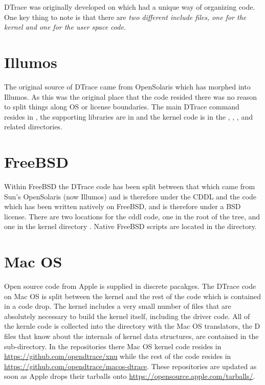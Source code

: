 DTrace was originally developed on  which had a
unique way of organizing code.  One key thing to note is that there
are \em{two different}  include files, one for the
kernel and one for the user space code.

\section{Illumos}
\label{sec:illumos-code}

The original source of DTrace came from OpenSolaris which has morphed
into Illumos.  As this was the original place that the code resided
there was no reason to split things along OS or license boundaries.
The main DTrace command resides in , the supporting
libraries are in  and the kernel code is in
the , , ,
and related directories.

\section{FreeBSD}
\label{sec:freebsd-code}

Within FreeBSD the DTrace code has been split between that which came
from Sun's OpenSolaris (now Illumos) and is therefore under the CDDL
and the code which has been written natively on FreeBSD, and is
therefore under a BSD license.  There are two locations for the cddl
code, one in the root of the tree,  and one in the
kernel directory .  Native FreeBSD scripts are
located in the  directory.

\section{Mac OS}
\label{sec:macos-code}

Open source code from Apple is supplied in discrete pacakges.  The
DTrace code on Mac OS is split between the  kernel and
the rest of the code which is contained in a  code
drop.  The kernel includes a very small number of files that are
absolutely necessary to build the kernel itself, including the driver
code.  All of the kernle code is collected into the
 directory with the Mac OS translators,
the D files that know about the internals of kernel data structures,
are contained in the  sub-directory.  In the
 repositories there Mac OS kernel code resides in
\url{https://github.com/opendtrace/xnu} while the rest of the code
resides in \url{https://github.com/opendtrace/macos-dtrace}.  These
repositories are updated as soon as Apple drops their tarballs onto
\url{https://opensource.apple.com/tarballs/}.

